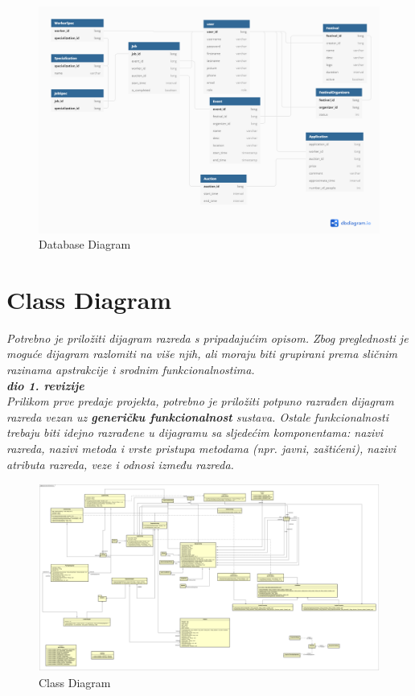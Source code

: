 				\begin{figure}[H]
					\includegraphics[width=\linewidth]{diagrams/db_normal_diag.png}
					\centering
					\caption{Database Diagram}
					\label{fig:normal_diag}
				\end{figure}
			
			\eject
			
			
		\section{Class Diagram}
		
			\textit{Potrebno je priložiti dijagram razreda s pripadajućim opisom. Zbog preglednosti je moguće dijagram razlomiti na više njih, ali moraju biti grupirani prema sličnim razinama apstrakcije i srodnim funkcionalnostima.}\\
			
			\textbf{\textit{dio 1. revizije}}\\
			
			\textit{Prilikom prve predaje projekta, potrebno je priložiti potpuno razrađen dijagram razreda vezan uz \textbf{generičku funkcionalnost} sustava. Ostale funkcionalnosti trebaju biti idejno razrađene u dijagramu sa sljedećim komponentama: nazivi razreda, nazivi metoda i vrste pristupa metodama (npr. javni, zaštićeni), nazivi atributa razreda, veze i odnosi između razreda.}\\
			
			\begin{figure}[H]
				\includegraphics[width=\linewidth]{diagrams/UML-OrganizationOfTheFestival_v1.png}
				\caption{Class Diagram}
				\label{fig:class_diag}
			\end{figure}
			
